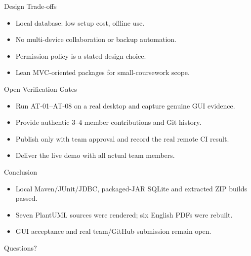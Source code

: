 \documentclass[aspectratio=169,11pt]{beamer}
\begin{document}
\begin{frame}{Design Trade-offs}\begin{itemize}\item Local database: low setup cost, offline use.\item No multi-device collaboration or backup automation.\item Permission policy is a stated design choice.\item Lean MVC-oriented packages for small-coursework scope.\end{itemize}\end{frame}
\begin{frame}{Open Verification Gates}\begin{itemize}\item Run AT-01--AT-08 on a real desktop and capture genuine GUI evidence.\item Provide authentic 3--4 member contributions and Git history.\item Publish only with team approval and record the real remote CI result.\item Deliver the live demo with all actual team members.\end{itemize}\end{frame}
\begin{frame}{Conclusion}\begin{itemize}\item Local Maven/JUnit/JDBC, packaged-JAR SQLite and extracted ZIP builds passed.\item Seven PlantUML sources were rendered; six English PDFs were rebuilt.\item GUI acceptance and real team/GitHub submission remain open.\end{itemize}\vspace{1em}\centering\large Questions?\end{frame}
\end{document}
